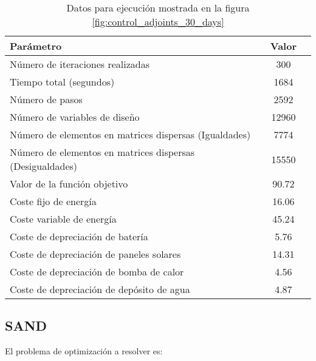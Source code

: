 \begin{table}[ht]
	\centering
	\caption{Datos para ejecución mostrada en la figura \ref{fig:control_adjoints_30_days}}
	\label{tab:control_adjoints_30_days}
	\begin{tabular}{@{}lcc@{}}
		\toprule
		Parámetro                                                 & Valor \\
		\midrule
		Número de iteraciones realizadas                          & 300   \\
		Tiempo total (segundos)                                   & 1684  \\
		Número de pasos                                           & 2592  \\
		Número de variables de diseño                             & 12960 \\
		Número de elementos en matrices dispersas (Igualdades)    & 7774  \\
		Número de elementos en matrices dispersas (Desigualdades) & 15550 \\
		\midrule
		Valor de la función objetivo                              & 90.72 \\
		\midrule
		Coste fijo de energía                                     & 16.06 \\
		Coste variable de energía                                 & 45.24 \\
		Coste de depreciación de batería                          & 5.76  \\
		Coste de depreciación de paneles solares                  & 14.31 \\
		Coste de depreciación de bomba de calor                   & 4.56  \\
		Coste de depreciación de depósito de agua                 & 4.87  \\
		\bottomrule
	\end{tabular}
\end{table}





\clearpage
\subsection{SAND}

El problema de optimización a resolver es:


